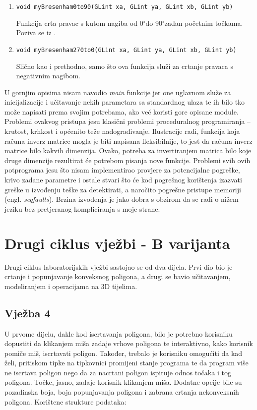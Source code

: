 \documentclass[utf8]{fer}
\newcommand{\degree}{\ensuremath{^\circ}}
\begin{document}
\begin{enumerate}
\item \begin{lstlisting}
void myBresenham0to90(GLint xa, GLint ya, GLint xb, GLint yb) 
\end{lstlisting}
Funkcija crta pravac s kutom nagiba od 0\degree  do 90\degree  zadan početnim točkama. Poziva se iz .

\item \begin{lstlisting}
void myBresenham270to0(GLint xa, GLint ya, GLint xb, GLint yb) 
\end{lstlisting}

Slično kao i prethodno, samo što ova funkcija služi za crtanje pravaca s negativnim nagibom. 

\end{enumerate}

U gornjim opisima nisam navodio \textit{main} funkcije jer one uglavnom služe za inicijalizacije i učitavanje nekih parametara sa standardnog ulaza te ih bilo tko može napisati prema svojim potrebama, ako već koristi gore opisane module. 
\newline \indent
Problemi ovakvog pristupa jesu klasični problemi proceduralnog programiranja -- krutost, krhkost i općenito teže nadograđivanje. Ilustracije radi, funkcija koja računa inverz matrice mogla je biti napisana fleksibilnije, to jest da računa inverz matrice bilo kakvih dimenzija. Ovako, potreba za invertiranjem matrica bilo koje druge dimenzije rezultirat će potrebom pisanja nove funkcije. Problemi svih ovih potprograma jesu što nisam implementirao provjere za potencijalne pogreške, krivo zadane parametre i ostale stvari što će kod pogrešnog korištenja izazvati greške u izvođenju teške za detektirati, a naročito pogrešne pristupe memoriji (engl. \textit{segfaults}). Brzina izvođenja je jako dobra s obzirom da se radi o nižem jeziku bez pretjeranog kompliciranja s moje strane. 

\chapter {Drugi ciklus vježbi - B varijanta}
Drugi ciklus laboratorijskih vježbi sastojao se od dva dijela. Prvi dio bio je crtanje i popunjavanje konveksnog poligona, a drugi se bavio učitavanjem, modeliranjem i operacijama na 3D tijelima. 
\section{Vježba 4}
U prvome dijelu, dakle kod iscrtavanja poligona, bilo je potrebno korisniku dopustiti da klikanjem miša zadaje vrhove poligona te interaktivno, kako korisnik pomiče miš, iscrtavati poligon. Također, trebalo je korisniku omogućiti da kad želi, pritiskom tipke na tipkovnici promijeni stanje programa te da program više ne iscrtava poligon nego da za nacrtani poligon ispituje odnos točaka i tog poligona. Točke, jasno, zadaje korisnik klikanjem miša. Dodatne opcije bile su pozadinska boja, boja popunjavanja poligona i zabrana crtanja nekonveksnih poligona. Korištene strukture podataka:
\end{document}
